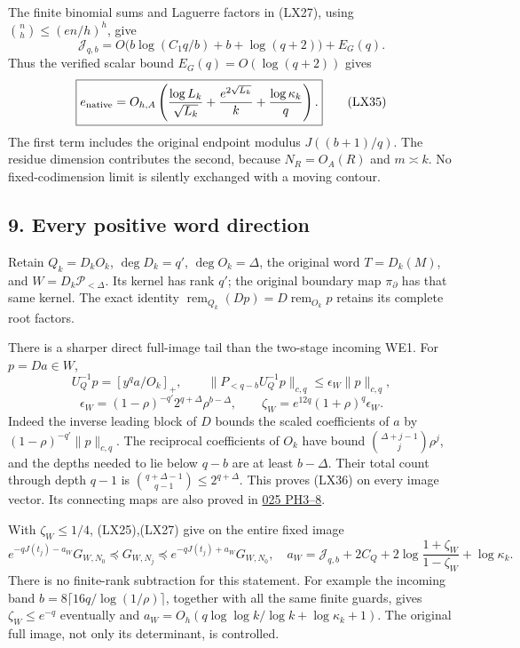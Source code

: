 \documentclass[10pt]{article}
\begin{document}
The finite binomial sums and Laguerre factors in (LX27), using \(\binom nh\le(en/h)^h\), give \[
\mathcal J_{q,b}=O\bigl(b\log(C_1q/b)+b+\log(q+2)\bigr)+E_G(q).
\] Thus the verified scalar bound \(E_G(q)=O(\log(q+2))\) gives \[
\boxed{e_{\rm native}
=O_{h,A}\left(\frac{\log L_k}{\sqrt{L_k}}
+\frac{e^{2\sqrt{L_k}}}{k}+\frac{\log\kappa_k}{q}\right).}
\tag{LX35}
\] The first term includes the original endpoint modulus \(J((b+1)/q)\). The residue dimension contributes the second, because \(N_R=O_A(R)\) and \(m\asymp k\). No fixed-codimension limit is silently exchanged with a moving contour.

\subsection{9. Every positive word direction}\label{every-positive-word-direction}

Retain \(Q_k=D_kO_k\), \(\deg D_k=q'\), \(\deg O_k=\Delta\), the original word \(T=D_k(M)\), and \(W=D_k\mathcal P_{<\Delta}\). Its kernel has rank \(q'\); the original boundary map \(\pi_\partial\) has that same kernel. The exact identity \(\operatorname{rem}_{Q_k}(Dp)=D\operatorname{rem}_{O_k}p\) retains its complete root factors.

There is a sharper direct full-image tail than the two-stage incoming WE1. For \(p=Da\in W\), \[
U_Q^{-1}p=[y^qa/O_k]_+,\qquad
\|P_{<q-b}U_Q^{-1}p\|_{c,q}
\le\epsilon_W\|p\|_{c,q},
\] \[
\epsilon_W=(1-\rho)^{-q'}2^{q+\Delta}\rho^{b-\Delta},
\qquad\zeta_W=e^{12q}(1+\rho)^q\epsilon_W.
\tag{LX36}
\] Indeed the inverse leading block of \(D\) bounds the scaled coefficients of \(a\) by \((1-\rho)^{-q'}\|p\|_{c,q}\). The reciprocal coefficients of \(O_k\) have bound \(\binom{\Delta+j-1}j\rho^j\), and the depths needed to lie below \(q-b\) are at least \(b-\Delta\). Their total count through depth \(q-1\) is \(\binom{q+\Delta-1}{q-1}\le2^{q+\Delta}\). This proves (LX36) on every image vector. Its connecting maps are also proved in \href{https://github.com/KokunoYumeto/zeta-function-research-reader/blob/6cf5b3aa8ff395eba6b5512b28d117334da5767b/workbenches/splitzero-tandem/continuations/20260922-cutoff-profile/PHASE_HEAT_PROOFS.md\#L34}{025 PH3--8}.

With \(\zeta_W\le1/4\), (LX25),(LX27) give on the entire fixed image \[
e^{-qJ(t_j)-a_W}G_{W,N_0}\preceq G_{W,N_j}
\preceq e^{-qJ(t_j)+a_W}G_{W,N_0},
\quad a_W=\mathcal J_{q,b}+2C_Q+2\log\frac{1+\zeta_W}{1-\zeta_W}+\log\kappa_k.
\tag{LX37}
\] There is no finite-rank subtraction for this statement. For example the incoming band \(b=8\lceil16q/\log(1/\rho)\rceil\), together with all the same finite guards, gives \(\zeta_W\le e^{-q}\) eventually and \(a_W=O_h(q\log\log k/\log k+\log\kappa_k+1)\). The original full image, not only its determinant, is controlled.
\end{document}
